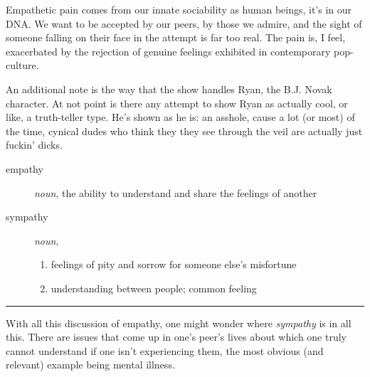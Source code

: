 \documentclass[../butidigress.tex]{subfiles}
\begin{document}
Empathetic pain comes from our innate sociability as human beings, it's in our DNA.
We want to be accepted by our peers, by those we admire, and the sight of someone falling on their face in the attempt is far too real.
The pain is, I feel, exacerbated by the rejection of genuine feelings exhibited in contemporary pop-culture.

An additional note is the way that the show handles Ryan, the B.J. Novak character.
At not point is there any attempt to show Ryan as actually cool, or like, a truth-teller type.
He's shown as he is: an asshole, cause a lot (or most) of the time, cynical dudes who think they they see through the veil are actually just fuckin' dicks.

\begin{description}
    \item [empathy] \textit{noun}, the ability to understand and share the feelings of another
    \item [sympathy] \textit{noun},

    \begin{enumerate}
        \item feelings of pity and sorrow for someone else's misfortune
        \item understanding between people; common feeling
    \end{enumerate}
\end{description}

\vspace{0.1cm}\noindent\hfill\rule{0.5\textwidth}{0.5pt}\hfill\vspace{0.5cm}

With all this discussion of empathy, one might wonder where \emph{sympathy} is in all this.
There are issues that come up in one's peer's lives about which one truly cannot understand if one isn't experiencing them, the most obvious (and relevant) example being mental illness.
\end{document}
